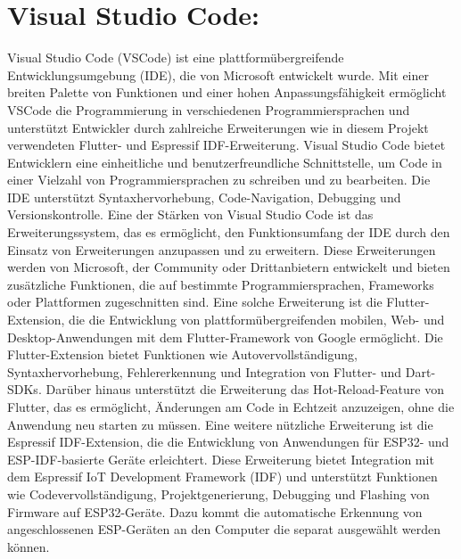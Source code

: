 \section{Visual Studio Code:}
Visual Studio Code (VSCode) ist eine plattformübergreifende  Entwicklungsumgebung (IDE), die von Microsoft entwickelt wurde. 
Mit einer breiten Palette von Funktionen und einer hohen Anpassungsfähigkeit ermöglicht VSCode die Programmierung in verschiedenen Programmiersprachen und unterstützt 
Entwickler durch zahlreiche \newline Erweiterungen wie in diesem Projekt verwendeten  Flutter- und Espressif IDF-Erweiterung.
Visual Studio Code bietet Entwicklern eine einheitliche und benutzerfreundliche Schnittstelle, um Code in einer Vielzahl von Programmiersprachen zu schreiben und zu bearbeiten. 
Die IDE unterstützt Syntaxhervorhebung, Code-Navigation, Debugging und Versionskontrolle.
Eine der Stärken von Visual Studio Code ist das Erweiterungssystem, das es ermöglicht, den Funktionsumfang der IDE durch den Einsatz von Erweiterungen anzupassen und zu erweitern. 
Diese Erweiterungen werden von Microsoft, der Community oder Drittanbietern entwickelt und bieten zusätzliche Funktionen, die auf bestimmte
\newline Programmiersprachen, Frameworks oder Plattformen zugeschnitten sind. 
Eine solche Erweiterung ist die Flutter-Extension, die die Entwicklung von plattformübergreifenden mobilen, Web- und Desktop-Anwendungen mit dem Flutter-Framework von Google ermöglicht. 
Die Flutter-Extension bietet Funktionen wie Autovervollständigung, \newline Syntaxhervorhebung, Fehlererkennung und Integration von Flutter- und Dart-SDKs. 
Darüber hinaus unterstützt die Erweiterung das Hot-Reload-Feature von Flutter, das es ermöglicht, Änderungen am Code in Echtzeit anzuzeigen, ohne die Anwendung neu starten zu müssen.
Eine weitere nützliche Erweiterung ist die Espressif IDF-Extension, die die Entwicklung von Anwendungen für ESP32- und ESP-IDF-basierte Geräte erleichtert.
 Diese Erweiterung bietet Integration mit dem Espressif IoT Development Framework (IDF) und unterstützt Funktionen wie Codevervollständigung, \newline Projektgenerierung, Debugging und Flashing von Firmware auf ESP32-Geräte. Dazu kommt die automatische 
 Erkennung von angeschlossenen ESP-Geräten an den Computer die separat ausgewählt werden können.
